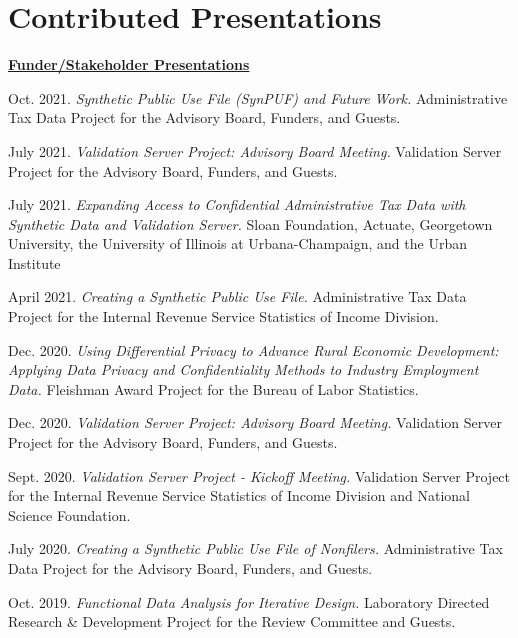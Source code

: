 \documentclass[11pt, letterpaper, roman]{moderncv} %
\begin{document}
\section{Contributed Presentations}
\underline{\textbf{\large Funder/Stakeholder Presentations}}\normalsize
\vspace{4pt}
\begin{etaremune}[topsep=0pt, itemsep=6pt, partopsep=0pt, parsep=0pt]
    \item Oct. 2021. \textit{Synthetic Public Use File (SynPUF) and Future Work.} Administrative Tax Data Project for the Advisory Board, Funders, and Guests.
    
    \item July 2021. \textit{Validation Server Project: Advisory Board Meeting.} Validation Server Project for the Advisory Board, Funders, and Guests.
    
    \item July 2021. \textit{Expanding Access to Confidential Administrative Tax Data with Synthetic Data and Validation Server.} Sloan Foundation, Actuate, Georgetown University, the University of Illinois at Urbana-Champaign, and the Urban Institute
    
    \item April 2021. \textit{Creating a Synthetic Public Use File.} Administrative Tax Data Project for the Internal Revenue Service Statistics of Income Division.

    \item Dec. 2020. \textit{Using Differential Privacy to Advance Rural Economic Development: Applying Data Privacy and Confidentiality Methods to Industry Employment Data.} Fleishman Award Project for the Bureau of Labor Statistics.
    
    \item Dec. 2020. \textit{Validation Server Project: Advisory Board Meeting.} Validation Server Project for the Advisory Board, Funders, and Guests.
    
    \item Sept. 2020. \textit{Validation Server Project - Kickoff Meeting.} Validation Server Project for the Internal Revenue Service Statistics of Income Division and National Science Foundation.
    
    \item July 2020. \textit{Creating a Synthetic Public Use File of Nonfilers.} Administrative Tax Data Project for the Advisory Board, Funders, and Guests.
    
    \item Oct. 2019. \textit{Functional Data Analysis for Iterative Design.} Laboratory Directed Research \& Development Project for the Review Committee and Guests.


\end{etaremune}
\end{document}
